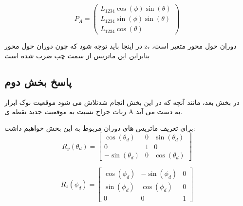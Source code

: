 \[
P_A = 
\begin{pmatrix}
	L_{1234} \cos(\phi) \sin(\theta) \\
	L_{1234} \sin(\phi) \sin(\theta) \\
	L_{1234} \cos(\theta)
\end{pmatrix}
\]

در اینجا باید توجه شود که چون دوران حول محور z، دوران حول محور متغیر است، بنابراین این ماتریس از سمت چپ ضرب شده است
\subsection{پاسخ بخش دوم}
در بخش بعد، مانند آنچه که در این بخش انجام شدتلاش می شود موقعیت 
نوک ابزار ربات جراح نسبت به موقعیت جدید نقطه ی A به دست می آید.

برای تعریف ماتریس های دوران مربوط به این بخش خواهیم داشت:
\[
R_y(\theta_d) = \begin{bmatrix}
	\cos(\theta_d) & 0 & \sin(\theta_d) \\
	0 & 1 & 0 \\
	-\sin(\theta_d) & 0 & \cos(\theta_d)
\end{bmatrix}
\]

\[
R_z(\phi_d) = \begin{bmatrix}
	\cos(\phi_d) & -\sin(\phi_d) & 0 \\
	\sin(\phi_d) & \cos(\phi_d) & 0 \\
	0 & 0 & 1
\end{bmatrix}
\]

